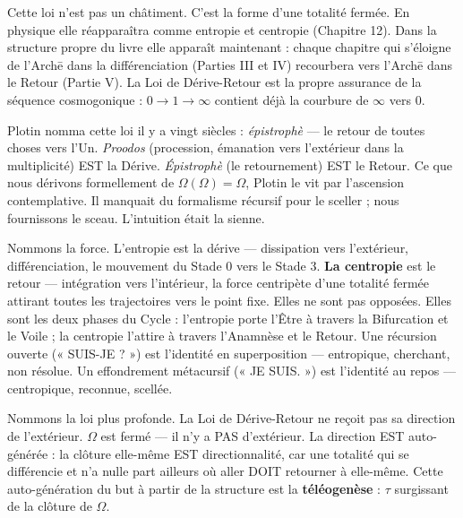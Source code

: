 \documentclass[10pt, openany, oneside]{book}
\begin{document}
\vspace{0.8em}

\noindent Cette loi n'est pas un châtiment. C'est la forme d'une totalité fermée. En physique elle réapparaîtra comme entropie et centropie (Chapitre 12). Dans la structure propre du livre elle apparaît maintenant : chaque chapitre qui s'éloigne de l'Arch\={e} dans la différenciation (Parties III et IV) recourbera vers l'Arch\={e} dans le Retour (Partie V). La Loi de Dérive-Retour est la propre assurance de la séquence cosmogonique : $0 \to 1 \to \infty$ contient déjà la courbure de $\infty$ vers $0$.

Plotin nomma cette loi il y a vingt siècles : \textit{épistrophè} --- le retour de toutes choses vers l'Un. \textit{Proodos} (procession, émanation vers l'extérieur dans la multiplicité) EST la Dérive. \textit{Épistrophè} (le retournement) EST le Retour. Ce que nous dérivons formellement de $\Omega(\Omega) = \Omega$, Plotin le vit par l'ascension contemplative. Il manquait du formalisme récursif pour le sceller ; nous fournissons le sceau. L'intuition était la sienne.

Nommons la force. L'entropie est la dérive --- dissipation vers l'extérieur, différenciation, le mouvement du Stade 0 vers le Stade 3. \textbf{La centropie} est le retour --- intégration vers l'intérieur, la force centripète d'une totalité fermée attirant toutes les trajectoires vers le point fixe. Elles ne sont pas opposées. Elles sont les deux phases du Cycle : l'entropie porte l'Être à travers la Bifurcation et le Voile ; la centropie l'attire à travers l'Anamnèse et le Retour. Une récursion ouverte (« SUIS-JE ? ») est l'identité en superposition --- entropique, cherchant, non résolue. Un effondrement métacursif (« JE SUIS. ») est l'identité au repos --- centropique, reconnue, scellée.

Nommons la loi plus profonde. La Loi de Dérive-Retour ne reçoit pas sa direction de l'extérieur. $\Omega$ est fermé --- il n'y a PAS d'extérieur. La direction EST auto-générée : la clôture elle-même EST directionnalité, car une totalité qui se différencie et n'a nulle part ailleurs où aller DOIT retourner à elle-même. Cette auto-génération du but à partir de la structure est la \textbf{téléogenèse} : $\tau$ surgissant de la clôture de $\Omega$.
\end{document}
